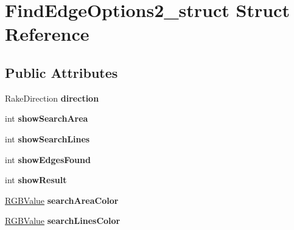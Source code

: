 \hypertarget{structFindEdgeOptions2__struct}{\section{\-Find\-Edge\-Options2\-\_\-struct \-Struct \-Reference}
\label{structFindEdgeOptions2__struct}
}
\subsection*{\-Public \-Attributes}
\begin{DoxyCompactItemize}
\item 
\hypertarget{structFindEdgeOptions2__struct_aa383f773103ee925094c5a628788f628}{\-Rake\-Direction {\bfseries direction}}\label{structFindEdgeOptions2__struct_aa383f773103ee925094c5a628788f628}

\item 
\hypertarget{structFindEdgeOptions2__struct_a78f45ad569722c7c5b22667546f5feae}{int {\bfseries show\-Search\-Area}}\label{structFindEdgeOptions2__struct_a78f45ad569722c7c5b22667546f5feae}

\item 
\hypertarget{structFindEdgeOptions2__struct_a95f56da94c39ed10ab235ab591db5b5f}{int {\bfseries show\-Search\-Lines}}\label{structFindEdgeOptions2__struct_a95f56da94c39ed10ab235ab591db5b5f}

\item 
\hypertarget{structFindEdgeOptions2__struct_a11623b0867857bdc0a7751dd29441416}{int {\bfseries show\-Edges\-Found}}\label{structFindEdgeOptions2__struct_a11623b0867857bdc0a7751dd29441416}

\item 
\hypertarget{structFindEdgeOptions2__struct_abb8ff9298cbb0c3ff5d1e740e8c6e590}{int {\bfseries show\-Result}}\label{structFindEdgeOptions2__struct_abb8ff9298cbb0c3ff5d1e740e8c6e590}

\item 
\hypertarget{structFindEdgeOptions2__struct_ab70e7baf7a8c3046ca7b70cf56741d7e}{\hyperlink{structRGBValue__struct}{\-R\-G\-B\-Value} {\bfseries search\-Area\-Color}}\label{structFindEdgeOptions2__struct_ab70e7baf7a8c3046ca7b70cf56741d7e}

\item 
\hypertarget{structFindEdgeOptions2__struct_ac044bfa5205a5884aea0f7815dd8022e}{\hyperlink{structRGBValue__struct}{\-R\-G\-B\-Value} {\bfseries search\-Lines\-Color}}\label{structFindEdgeOptions2__struct_ac044bfa5205a5884aea0f7815dd8022e}


\end{DoxyCompactItemize}
